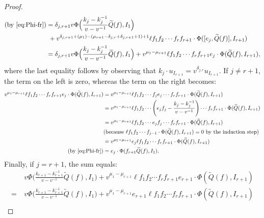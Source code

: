 \documentclass[10pt,a4paper]{amsart}
\begin{document}
\begin{proof}
\begin{align*}
\text{(by \eqref{eq:Phi-fr})}&=\delta_{j,r+1}v\Phi\Big(\frac{k_j-k_j^{-1}}{v-v^{-1}}\widetilde Q(f),I_1\Big) \\
&~+ v^{\delta_{j,r+1}+(\mu_1)-(\mu_{r+1}-\delta_{j,r}+\delta_{j,r+1}+1)+1}\ell f_1f_2\cdots f_rf_{r+1}\cdot \Phi([e_j,\widetilde{Q}(f)],I_{r+1})\\
&=\delta_{j,r+1}v\Phi\Big(\frac{k_j-k_j^{-1}}{v-v^{-1}}\widetilde Q(f),I_1\Big) + v^{\mu_1-\mu_{r+1}}\ell f_1f_2\cdots f_rf_{r+1}e_j\cdot\Phi(\widetilde{Q}(f),I_{r+1}),
\end{align*}
where the last equality follows by observing that $k_j\cdot u_{I_{r+1}}=v^{\delta_{j,r}}u_{I_{r+1}}.$ If $j\neq r+1$, the term on the left is zero, whereas the term on the right becomes:
\begin{align*}
v^{\mu_1-\mu_{r+1}}\ell f_1f_2\cdots f_rf_{r+1}e_j\cdot\Phi(\widetilde{Q}(f),I_{r+1})&=v^{\mu_1-\mu_{r+1}}\ell f_1f_2\cdots f_je_j\cdots f_rf_{r+1}\cdot\Phi(\widetilde{Q}(f),I_{r+1})\\
&=v^{\mu_1-\mu_{r+1}}\ell f_1f_2\cdots \left(e_jf_j -\frac{k_j-k_j^{-1}}{v-v^{-1}}\right)\cdots f_rf_{r+1}\cdot\Phi(\widetilde{Q}(f),I_{r+1})\\
&=v^{\mu_1-\mu_{r+1}}\ell f_1f_2\cdots e_jf_j \cdots f_rf_{r+1}\cdot\Phi(\widetilde{Q}(f),I_{r+1})\\
&\text{(because } \ell f_1f_2\cdots f_{j-1}\cdot \Phi(\widetilde{Q}(f),I_{r+1})=0 \text{ by the induction step)}\\
&=v^{\mu_1-\mu_{r+1}}e_j\ell f_1f_2\cdots f_rf_{r+1}\cdot\Phi(\widetilde{Q}(f),I_{r+1})\\
\text{(by \eqref{eq:Phi-fr})}&=e_j\cdot \Phi(f_{r+1} \widetilde{Q}(f),I_{1}).
\end{align*}
Finally, if $j=r+1$, the sum equals:
\begin{align*}
&~v\Phi\Big(\frac{k_{r+1}-k_{r+1}^{-1}}{v-v^{-1}}\widetilde Q(f),I_1\Big) + v^{\mu_1-\mu_{r+1}}\ell f_1f_2\cdots f_rf_{r+1}e_{r+1}\cdot\Phi(\widetilde{Q}(f),I_{r+1})\\
=&~v\Phi\Big(\frac{k_{r+1}-k_{r+1}^{-1}}{v-v^{-1}}\widetilde Q(f),I_1\Big) + v^{\mu_1-\mu_{r+1}}e_{r+1}\ell f_1f_2\cdots f_rf_{r+1}\cdot\Phi(\widetilde{Q}(f),I_{r+1})\\

\end{align*}
\end{proof}
\end{document}
